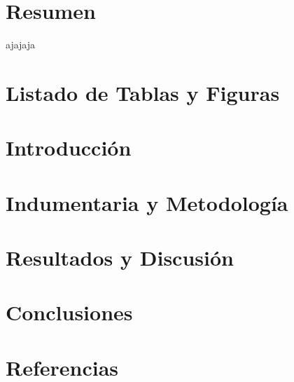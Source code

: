 \documentclass[12pt]{article}
\begin{document}

\tableofcontents
\pagebreak


\section{Resumen}
ajajaja
\section{Listado de Tablas y Figuras}
\section{Introducción}
\section{Indumentaria y Metodología}
\section{Resultados y Discusión}
\section{Conclusiones}
\section{Referencias}
\end{document}
